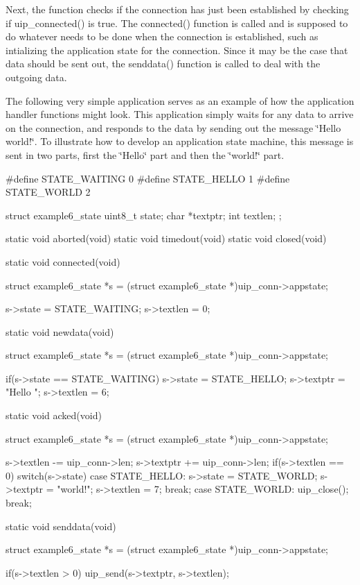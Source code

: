 \-Next, the function checks if the connection has just been established by checking if uip\-\_\-connected() is true. \-The connected() function is called and is supposed to do whatever needs to be done when the connection is established, such as intializing the application state for the connection. \-Since it may be the case that data should be sent out, the senddata() function is called to deal with the outgoing data.

\-The following very simple application serves as an example of how the application handler functions might look. \-This application simply waits for any data to arrive on the connection, and responds to the data by sending out the message \char`\"{}\-Hello world!\char`\"{}. \-To illustrate how to develop an application state machine, this message is sent in two parts, first the \char`\"{}\-Hello\char`\"{} part and then the \char`\"{}world!\char`\"{} part.


\begin{DoxyCode}
#define STATE_WAITING 0
#define STATE_HELLO   1
#define STATE_WORLD   2

struct example6_state {
  uint8_t state;
  char *textptr;
  int  textlen;
};

static void aborted(void) {}
static void timedout(void) {}
static void closed(void) {}

static void connected(void) {
  struct example6_state *s = (struct example6_state *)uip_conn->appstate;

  s->state   = STATE_WAITING;
  s->textlen = 0;
}

static void newdata(void) {
  struct example6_state *s = (struct example6_state *)uip_conn->appstate;

  if(s->state == STATE_WAITING) {
    s->state   = STATE_HELLO;
    s->textptr = "Hello ";
    s->textlen = 6;
  }
}

static void acked(void) {
  struct example6_state *s = (struct example6_state *)uip_conn->appstate;
  
  s->textlen -= uip_conn->len;
  s->textptr += uip_conn->len;
  if(s->textlen == 0) {
    switch(s->state) {
    case STATE_HELLO:
      s->state   = STATE_WORLD;
      s->textptr = "world!\n";
      s->textlen = 7;
      break;
    case STATE_WORLD:
      uip_close();
      break;
    }
  }
}

static void senddata(void) {
  struct example6_state *s = (struct example6_state *)uip_conn->appstate;

  if(s->textlen > 0) {
    uip_send(s->textptr, s->textlen);
  }
}
\end{DoxyCode}


